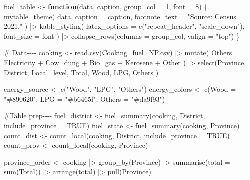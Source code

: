 \documentclass[
  letterpaper,
  DIV=11,
  numbers=noendperiod]{scrartcl}
\newenvironment{Shaded}{\begin{snugshade}}{\end{snugshade}}
\newcommand{\AttributeTok}[1]{\textcolor[rgb]{0.40,0.45,0.13}{#1}}
\newcommand{\CommentTok}[1]{\textcolor[rgb]{0.37,0.37,0.37}{#1}}
\newcommand{\ConstantTok}[1]{\textcolor[rgb]{0.56,0.35,0.01}{#1}}
\newcommand{\ControlFlowTok}[1]{\textcolor[rgb]{0.00,0.23,0.31}{\textbf{#1}}}
\newcommand{\DecValTok}[1]{\textcolor[rgb]{0.68,0.00,0.00}{#1}}
\newcommand{\FunctionTok}[1]{\textcolor[rgb]{0.28,0.35,0.67}{#1}}
\newcommand{\NormalTok}[1]{\textcolor[rgb]{0.00,0.23,0.31}{#1}}
\newcommand{\OtherTok}[1]{\textcolor[rgb]{0.00,0.23,0.31}{#1}}
\newcommand{\SpecialCharTok}[1]{\textcolor[rgb]{0.37,0.37,0.37}{#1}}
\newcommand{\StringTok}[1]{\textcolor[rgb]{0.13,0.47,0.30}{#1}}
\begin{document}
\begin{Shaded}
\begin{Highlighting}[]
\NormalTok{fuel\_table }\OtherTok{\textless{}{-}} \ControlFlowTok{function}\NormalTok{(data, caption, }\AttributeTok{group\_col =} \DecValTok{1}\NormalTok{, }\AttributeTok{font =} \DecValTok{8}\NormalTok{) \{}
  \FunctionTok{mytable\_theme}\NormalTok{(}
\NormalTok{    data,}
    \AttributeTok{caption =}\NormalTok{ caption,}
    \AttributeTok{footnote\_text =} \StringTok{"Source: Census 2021."}
\NormalTok{  ) }\SpecialCharTok{|\textgreater{}}
    \FunctionTok{kable\_styling}\NormalTok{(}
      \AttributeTok{latex\_options =} \FunctionTok{c}\NormalTok{(}\StringTok{"repeat\_header"}\NormalTok{, }\StringTok{"scale\_down"}\NormalTok{),}
      \AttributeTok{font\_size =}\NormalTok{ font}
\NormalTok{    ) }\SpecialCharTok{|\textgreater{}}
    \FunctionTok{collapse\_rows}\NormalTok{(}\AttributeTok{columns =}\NormalTok{ group\_col, }\AttributeTok{valign =} \StringTok{"top"}\NormalTok{)}
\NormalTok{\}}


\CommentTok{\# Data{-}{-}{-}{-}}
\NormalTok{cooking }\OtherTok{\textless{}{-}} \FunctionTok{read.csv}\NormalTok{(}\StringTok{\textquotesingle{}Cooking\_fuel\_NP.csv\textquotesingle{}}\NormalTok{) }\SpecialCharTok{|\textgreater{}}
  \FunctionTok{mutate}\NormalTok{(}
    \AttributeTok{Others =}\NormalTok{ Electricity }\SpecialCharTok{+}\NormalTok{ Cow\_dung }\SpecialCharTok{+}\NormalTok{ Bio\_gas }\SpecialCharTok{+}\NormalTok{ Kerosene }\SpecialCharTok{+}\NormalTok{ Other}
\NormalTok{  ) }\SpecialCharTok{|\textgreater{}}
  \FunctionTok{select}\NormalTok{(Province, District, Local\_level, Total, Wood, LPG, Others )}


\NormalTok{energy\_source }\OtherTok{\textless{}{-}} \FunctionTok{c}\NormalTok{(}\StringTok{"Wood"}\NormalTok{, }\StringTok{"LPG"}\NormalTok{, }\StringTok{"Others"}\NormalTok{)}
\NormalTok{energy\_colors }\OtherTok{\textless{}{-}} \FunctionTok{c}\NormalTok{(}\AttributeTok{Wood =} \StringTok{"\#890620"}\NormalTok{, }\AttributeTok{LPG =} \StringTok{"\#b6465f"}\NormalTok{, }\AttributeTok{Others =} \StringTok{"\#da9f93"}\NormalTok{)}

\CommentTok{\#Table prep{-}{-}{-}{-}}
\NormalTok{fuel\_district }\OtherTok{\textless{}{-}} \FunctionTok{fuel\_summary}\NormalTok{(cooking, District, }\AttributeTok{include\_province =} \ConstantTok{TRUE}\NormalTok{)}
\NormalTok{fuel\_state }\OtherTok{\textless{}{-}} \FunctionTok{fuel\_summary}\NormalTok{(cooking, Province)}
\NormalTok{count\_dist }\OtherTok{\textless{}{-}} \FunctionTok{count\_local}\NormalTok{(cooking, District, }\AttributeTok{include\_province =} \ConstantTok{TRUE}\NormalTok{)}
\NormalTok{count\_prov }\OtherTok{\textless{}{-}} \FunctionTok{count\_local}\NormalTok{(cooking, Province)}

\NormalTok{province\_order }\OtherTok{\textless{}{-}}\NormalTok{ cooking }\SpecialCharTok{|\textgreater{}}
  \FunctionTok{group\_by}\NormalTok{(Province) }\SpecialCharTok{|\textgreater{}}
  \FunctionTok{summarise}\NormalTok{(}\AttributeTok{total =} \FunctionTok{sum}\NormalTok{(Total)) }\SpecialCharTok{|\textgreater{}}
  \FunctionTok{arrange}\NormalTok{(total) }\SpecialCharTok{|\textgreater{}}
  \FunctionTok{pull}\NormalTok{(Province)}
\end{Highlighting}
\end{Shaded}
\end{document}
